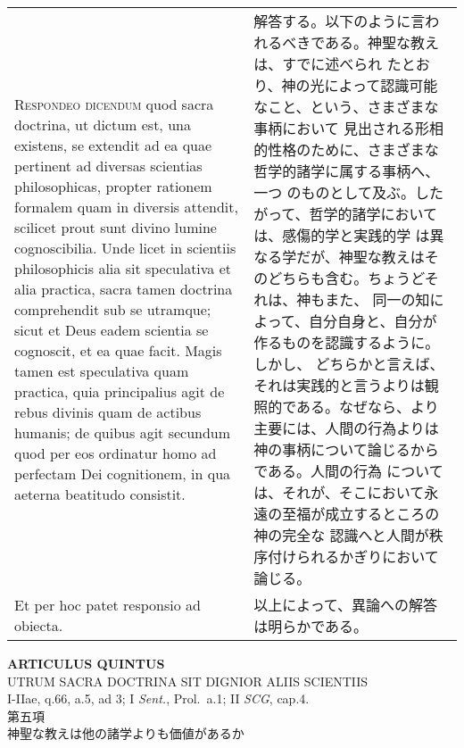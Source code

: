 \documentclass[10pt]{jsarticle}
\begin{document}
\begin{longtable}{p{21em}p{21em}}
\\


{\scshape Respondeo dicendum} quod sacra doctrina, ut dictum est, una
existens, se extendit ad ea quae pertinent ad diversas scientias
philosophicas, propter rationem formalem quam in diversis attendit,
scilicet prout sunt divino lumine cognoscibilia. Unde licet in
scientiis philosophicis alia sit speculativa et alia practica, sacra
tamen doctrina comprehendit sub se utramque; sicut et Deus eadem
scientia se cognoscit, et ea quae facit. Magis tamen est speculativa
quam practica, quia principalius agit de rebus divinis quam de actibus
humanis; de quibus agit secundum quod per eos ordinatur homo ad
perfectam Dei cognitionem, in qua aeterna beatitudo consistit.


&

解答する。以下のように言われるべきである。神聖な教えは、すでに述べられ
たとおり、神の光によって認識可能なこと、という、さまざまな事柄において
見出される形相的性格のために、さまざまな哲学的諸学に属する事柄へ、一つ
のものとして及ぶ。したがって、哲学的諸学においては、感傷的学と実践的学
は異なる学だが、神聖な教えはそのどちらも含む。ちょうどそれは、神もまた、
同一の知によって、自分自身と、自分が作るものを認識するように。しかし、
どちらかと言えば、それは実践的と言うよりは観照的である。なぜなら、より
主要には、人間の行為よりは神の事柄について論じるからである。人間の行為
については、それが、そこにおいて永遠の至福が成立するところの神の完全な
認識へと人間が秩序付けられるかぎりにおいて論じる。


\\


Et per hoc patet responsio ad obiecta.


&

以上によって、異論への解答は明らかである。


\end{longtable}
\newpage


\begin{center}
 {\Large {\bf ARTICULUS QUINTUS}}\\
 {\large UTRUM SACRA DOCTRINA SIT DIGNIOR ALIIS SCIENTIIS}\\
 {\footnotesize I-IIae, q.66, a.5, ad 3; I {\itshape Sent.}, Prol.~a.1;
 II {\itshape SCG}, cap.4.}\\
 {\Large 第五項\\神聖な教えは他の諸学よりも価値があるか}
\end{center}
\end{document}
